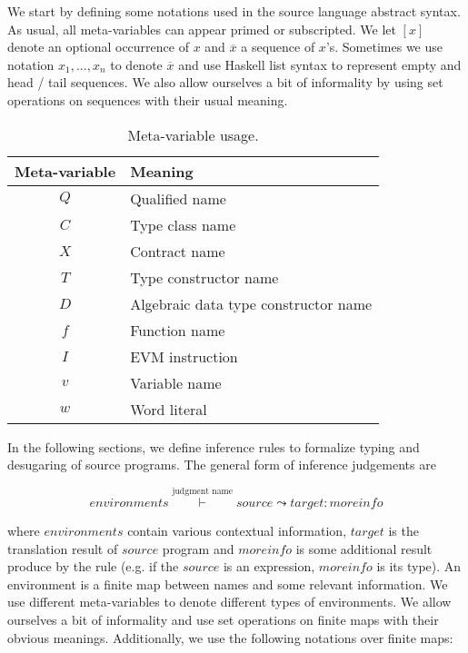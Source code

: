 \documentclass[a4paper, 11pt]{article}
\begin{document}
We start by defining some notations used in the 
source language abstract syntax. As usual, all 
meta-variables can appear primed or subscripted. 
We let $[x]$ denote an optional occurrence of $x$ and  
$\overline{x}$ a sequence of $x$'s. Sometimes 
we use notation $x_1,...,x_n$ to denote $\overline{x} $
and use Haskell list syntax to represent empty 
and head / tail sequences. We also allow ourselves 
a bit of informality by using set operations on 
sequences with their usual meaning.

\begin{table}[H]
  \begin{tabular}{|c|l|} 
    \hline 
    Meta-variable & Meaning \\
    \hline 
    $Q$        & Qualified name \\ 
    $C$        & Type class name\\
    $X$        & Contract name\\ 
    $T$        & Type constructor name\\
    $D$        & Algebraic data type constructor name\\
    $f$        & Function name\\ 
    $I$        & EVM instruction\\
    $v$        & Variable name \\
    $w$        & Word literal \\
    \hline
  \end{tabular}
  \centering
  \caption{Meta-variable usage.}
\end{table}

In the following sections, we define inference rules to 
formalize typing and desugaring of source programs. 
The general form of inference judgements are 

\[
  environments \overset{\text{judgment name}}{\vdash} source \leadsto target : moreinfo
\]

where $environments$ contain various contextual information, $target$ is 
the translation result of $source$ program and $moreinfo$ is some 
additional result produce by the rule (e.g. if the $source$ is an 
expression, $moreinfo$ is its type).
An environment is a finite map between names and some relevant 
information. We use different meta-variables to denote different 
types of environments.
We allow ourselves a bit of informality and use 
set operations on finite maps with their obvious meanings.
Additionally, we use the following notations over finite maps:
\end{document}
